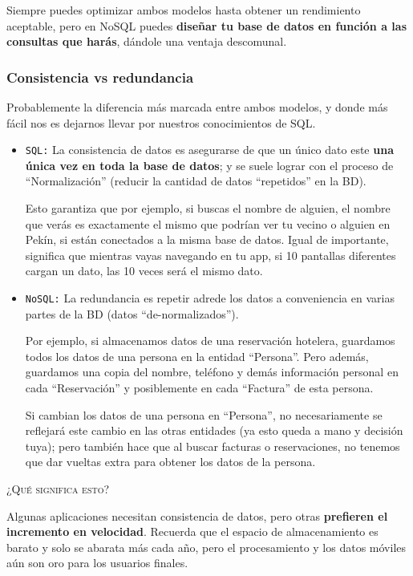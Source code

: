 Siempre puedes optimizar ambos modelos hasta obtener un rendimiento aceptable, pero en NoSQL puedes \textbf{diseñar tu base de datos en función a las consultas que harás}, dándole una ventaja descomunal.


\subsubsection*{Consistencia vs redundancia}

Probablemente la diferencia más marcada entre ambos modelos, y donde más fácil nos es dejarnos llevar por nuestros conocimientos de SQL.

\begin{itemize}
\item \texttt{SQL:} La consistencia de datos es asegurarse de que un único dato este \textbf{una única vez en toda la base de datos}; y se suele lograr con el proceso de “Normalización” (reducir la cantidad de datos “repetidos” en la BD).

Esto garantiza que por ejemplo, si buscas el nombre de alguien, el nombre que verás es exactamente el mismo que podrían ver tu vecino o alguien en Pekín, si están conectados a la misma base de datos. Igual de importante, significa que mientras vayas navegando en tu app, si 10 pantallas diferentes cargan un dato, las 10 veces será el mismo dato.

\item \texttt{NoSQL:} La redundancia es repetir adrede los datos a conveniencia en varias partes de la BD (datos “de-normalizados”).

Por ejemplo, si almacenamos datos de una reservación hotelera, guardamos todos los datos de una persona en la entidad “Persona”. Pero además, guardamos una copia del nombre, teléfono y demás información personal en cada “Reservación” y posiblemente en cada “Factura” de esta persona.

Si cambian los datos de una persona en “Persona”, no necesariamente se reflejará este cambio en las otras entidades (ya esto queda a mano y decisión tuya); pero también hace que al buscar facturas o reservaciones, no tenemos que dar vueltas extra para obtener los datos de la persona.

\end{itemize}

\textsc{¿Qué significa esto?}

Algunas aplicaciones necesitan consistencia de datos, pero otras \textbf{prefieren el incremento en velocidad}. Recuerda que el espacio de almacenamiento es barato y solo se abarata más cada año, pero el procesamiento y los datos móviles aún son oro para los usuarios finales.

